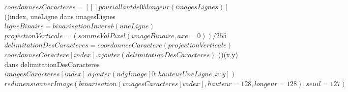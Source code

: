 \documentclass[a4paper]{article}
\begin{document}
\begin{algorithm}
				\BlankLine
				$coordonneesCaracteres = [[] pour i allant de 0 à longeur(imagesLignes)]$\;
				\BlankLine
				\For(){index, uneLigne dans imagesLignes}
				{
					$ligneBinaire = binarisationInversé(uneLigne)$\;
					$projectionVerticale = (sommeValPixel(imageBinaire, axe=0)) / 255$\;
					$delimitationDesCaracteres = coordonneeCaractere(projectionVerticale)$\;
					\BlankLine
					$coordonneeCaractere[index].ajouter(delimitationDesCaracteres)$\;
    				\For(){(x,y) dans delimitationDesCaracteres}
					{
						$imagesCaracteres[index].ajouter(ndgImage[0:hauteurUneLigne, x:y])$\;
					}
					$redimensionnerImage(binarisation(imagesCaracteres[index],hauteur = 128,longeur = 128), seuil = 127)$\;
					\BlankLine
				}
			\end{algorithm}
			\newpage
\end{document}
